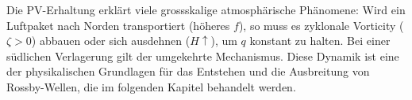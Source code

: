 Die PV-Erhaltung erklärt viele grossskalige atmosphärische Phänomene:
Wird ein Luftpaket nach Norden transportiert (höheres \(f\)), so muss es zyklonale Vorticity (\(\zeta > 0\)) abbauen oder sich ausdehnen (\(H \uparrow\)), um \(q\) konstant zu halten. 
Bei einer südlichen Verlagerung gilt der umgekehrte Mechanismus. 
Diese Dynamik ist eine der physikalischen Grundlagen für das Entstehen und die Ausbreitung von Rossby-Wellen, die im folgenden Kapitel behandelt werden.
